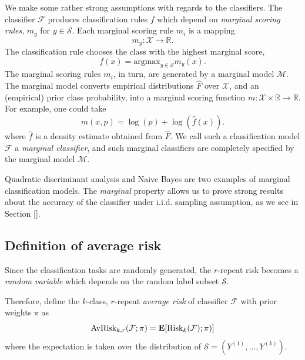 \documentclass[12pt]{article}
\begin{document}
We make some rather strong assumptions with regards to the
classifiers.  The classifier $\mathcal{F}$ produces classification
rules $f$ which depend on \emph{marginal scoring rules}, $m_y$ for $y
\in \mathcal{S}$.  Each marginal scoring rule $m_i$ is a mapping
\[
m_y: \mathcal{X} \to \mathbb{R}.
\]
The classification rule chooses the class with the highest marginal score,
\[
f(x) = \text{argmax}_{y \in \mathcal{S}} m_y(x).
\]
The marginal scoring rules $m_i$, in turn, are generated by a marginal
model $\mathcal{M}$.  The marginal model converts empirical
distributions $\hat{F}$ over $\mathcal{X}$, and an (empirical) prior
class probability, into a marginal scoring function $m: \mathcal{X}
\times \mathbb{R} \to \mathbb{R}$.  For example, one could take 
\[m(x,p) = \log(p) + \log(\hat{f}(x)).\]
where $\hat{f}$ is a density estimate obtained from
$\hat{F}$.  We call such a classification model $\mathcal{F}$ a
\emph{marginal classifier}, and such marginal classifiers are
completely specified by the marginal model $\mathcal{M}.$

Quadratic discriminant analysis and Naive Bayes are two examples of
marginal classification models.
The \emph{marginal} property allows us to prove strong results about
the accuracy of the classifier under i.i.d. sampling
assumption, as we see in Section [].

\subsection{Definition of average risk}\label{sec:average_risk}

Since the classification tasks are randomly generated, the $r$-repeat
risk becomes a \emph{random variable} which depends on the random
label subset $\mathcal{S}$.

Therefore, define the $k$-class, $r$-repeat \emph{average risk} of classifier $\mathcal{F}$ with prior weights $\pi$ as
\[
\text{AvRisk}_{k, r}(\mathcal{F}; \pi) = \textbf{E}[\text{Risk}_k(\mathcal{F}); \pi)]
\]
where the expectation is taken over the distribution of $\mathcal{S} = (Y^{(1)},\hdots, Y^{(k)})$.
\end{document}
